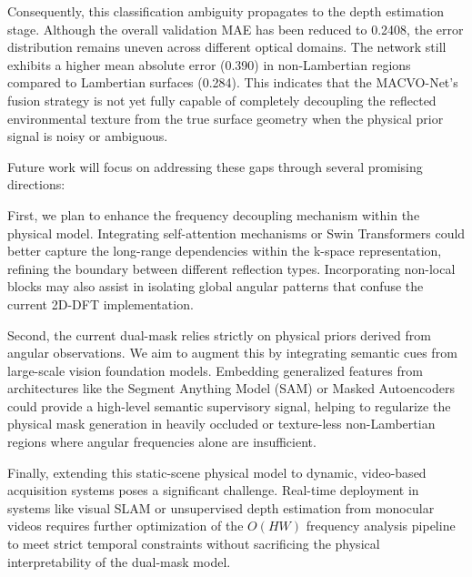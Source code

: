 \documentclass[lettersize,journal]{IEEEtran}
\begin{document}
Consequently, this classification ambiguity propagates to the depth estimation stage. Although the overall validation MAE has been reduced to 0.2408, the error distribution remains uneven across different optical domains. The network still exhibits a higher mean absolute error (0.390) in non-Lambertian regions compared to Lambertian surfaces (0.284). This indicates that the MACVO-Net's fusion strategy is not yet fully capable of completely decoupling the reflected environmental texture from the true surface geometry when the physical prior signal is noisy or ambiguous.

Future work will focus on addressing these gaps through several promising directions:

First, we plan to enhance the frequency decoupling mechanism within the physical model. Integrating self-attention mechanisms \cite{vaswani2017} or Swin Transformers \cite{liu2021} could better capture the long-range dependencies within the k-space representation, refining the boundary between different reflection types. Incorporating non-local blocks \cite{heNone} may also assist in isolating global angular patterns that confuse the current 2D-DFT implementation.

Second, the current dual-mask relies strictly on physical priors derived from angular observations. We aim to augment this by integrating semantic cues from large-scale vision foundation models. Embedding generalized features from architectures like the Segment Anything Model (SAM) \cite{kirillov2023} or Masked Autoencoders \cite{he2022} could provide a high-level semantic supervisory signal, helping to regularize the physical mask generation in heavily occluded or texture-less non-Lambertian regions where angular frequencies alone are insufficient.

Finally, extending this static-scene physical model to dynamic, video-based acquisition systems poses a significant challenge. Real-time deployment in systems like visual SLAM \cite{tardsNone} or unsupervised depth estimation from monocular videos \cite{shiNone} requires further optimization of the $O(HW)$ frequency analysis pipeline to meet strict temporal constraints without sacrificing the physical interpretability of the dual-mask model.



\end{document}

